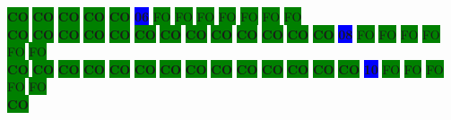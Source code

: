 \colorbox{green}{\color[rgb]{0,0,0}\textbf{CO}}%
\colorbox{green}{\color[rgb]{0,0,0}\textbf{CO}}%
\colorbox{green}{\color[rgb]{0,0,0}\textbf{CO}}%
\colorbox{green}{\color[rgb]{0,0,0}\textbf{CO}}%
\colorbox{green}{\color[rgb]{0,0,0}\textbf{CO}}%
\colorbox{blue}{\color[rgb]{1,0,0}\textbf{06}}%
\colorbox{green}{\color[gray]{0.75}FO}%
\colorbox{green}{\color[gray]{0.75}FO}%
\colorbox{green}{\color[gray]{0.75}FO}%
\colorbox{green}{\color[gray]{0.75}FO}%
\colorbox{green}{\color[gray]{0.75}FO}%
\colorbox{green}{\color[gray]{0.75}FO}%
\colorbox{green}{\color[gray]{0.75}FO}%
\\
\colorbox{green}{\color[rgb]{0,0,0}\textbf{CO}}%
\colorbox{green}{\color[rgb]{0,0,0}\textbf{CO}}%
\colorbox{green}{\color[rgb]{0,0,0}\textbf{CO}}%
\colorbox{green}{\color[rgb]{0,0,0}\textbf{CO}}%
\colorbox{green}{\color[rgb]{0,0,0}\textbf{CO}}%
\colorbox{green}{\color[rgb]{0,0,0}\textbf{CO}}%
\colorbox{green}{\color[rgb]{0,0,0}\textbf{CO}}%
\colorbox{green}{\color[rgb]{0,0,0}\textbf{CO}}%
\colorbox{green}{\color[rgb]{0,0,0}\textbf{CO}}%
\colorbox{green}{\color[rgb]{0,0,0}\textbf{CO}}%
\colorbox{green}{\color[rgb]{0,0,0}\textbf{CO}}%
\colorbox{green}{\color[rgb]{0,0,0}\textbf{CO}}%
\colorbox{green}{\color[rgb]{0,0,0}\textbf{CO}}%
\colorbox{blue}{\color[rgb]{1,0,0}\textbf{08}}%
\colorbox{green}{\color[gray]{0.75}FO}%
\colorbox{green}{\color[gray]{0.75}FO}%
\colorbox{green}{\color[gray]{0.75}FO}%
\colorbox{green}{\color[gray]{0.75}FO}%
\colorbox{green}{\color[gray]{0.75}FO}%
\colorbox{green}{\color[gray]{0.75}FO}%
\\
\colorbox{green}{\color[rgb]{0,0,0}\textbf{CO}}%
\colorbox{green}{\color[rgb]{0,0,0}\textbf{CO}}%
\colorbox{green}{\color[rgb]{0,0,0}\textbf{CO}}%
\colorbox{green}{\color[rgb]{0,0,0}\textbf{CO}}%
\colorbox{green}{\color[rgb]{0,0,0}\textbf{CO}}%
\colorbox{green}{\color[rgb]{0,0,0}\textbf{CO}}%
\colorbox{green}{\color[rgb]{0,0,0}\textbf{CO}}%
\colorbox{green}{\color[rgb]{0,0,0}\textbf{CO}}%
\colorbox{green}{\color[rgb]{0,0,0}\textbf{CO}}%
\colorbox{green}{\color[rgb]{0,0,0}\textbf{CO}}%
\colorbox{green}{\color[rgb]{0,0,0}\textbf{CO}}%
\colorbox{green}{\color[rgb]{0,0,0}\textbf{CO}}%
\colorbox{green}{\color[rgb]{0,0,0}\textbf{CO}}%
\colorbox{green}{\color[rgb]{0,0,0}\textbf{CO}}%
\colorbox{blue}{\color[rgb]{1,0,0}\textbf{10}}%
\colorbox{green}{\color[gray]{0.75}FO}%
\colorbox{green}{\color[gray]{0.75}FO}%
\colorbox{green}{\color[gray]{0.75}FO}%
\colorbox{green}{\color[gray]{0.75}FO}%
\colorbox{green}{\color[gray]{0.75}FO}%
\\
\colorbox{green}{\color[rgb]{0,0,0}\textbf{CO}}%
